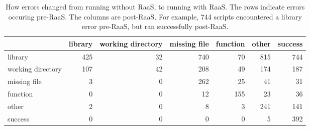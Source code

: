 \begin{table}
\centering
\caption{How errors changed from running without RaaS, to running with RaaS. The rows indicate errors occuring pre-RaaS. The columns are post-RaaS. For example, 744 scripts encountered a library error pre-RaaS, but ran successfully post-RaaS.}
\label{tab:error-change}
\begin{tabular}{lrrrrrr}
\toprule
{} &  library &  working directory &  missing file &  function &  other &  success \\
\midrule
library           &      425 &                 32 &           740 &        70 &    815 &      744 \\ \hline
working directory &      107 &                 42 &           208 &        49 &    174 &      187 \\ \hline
missing file      &        3 &                  0 &           262 &        25 &     41 &       31 \\ \hline
function          &        0 &                  0 &            12 &       155 &     23 &       36 \\ \hline
other             &        2 &                  0 &             8 &         3 &    241 &      141 \\ \hline
success           &        0 &                  0 &             0 &         0 &      5 &      392 \\
\bottomrule
\end{tabular}
\end{table}
